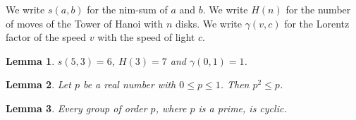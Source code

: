 \documentclass{article}
\newtheorem{lemma}{Lemma}
\begin{document}
We write $s(a,b)$ for the nim-sum of $a$ and $b$.
We write $H(n)$ for the number of moves of the Tower of Hanoi with $n$ disks.
We write $\gamma(v,c)$ for the Lorentz factor of the speed $v$ with the speed of light $c$.

\begin{lemma}\label{values}
$s(5,3)=6$, $H(3)=7$ and $\gamma(0,1)=1$.
\end{lemma}

\begin{lemma}\label{unit}
Let $p$ be a real number with $0\le p\le1$. Then $p^2\le p$.
\end{lemma}

\begin{lemma}\label{where-inside}
Every group of order $p$, where $p$ is a prime, is cyclic.
\end{lemma}
\end{document}
